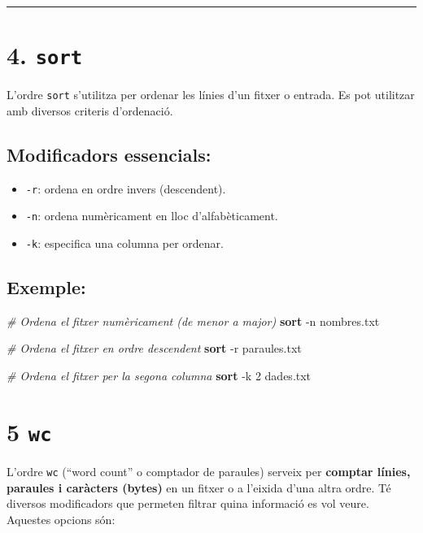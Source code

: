 \documentclass[
  12 pt,
  a4paper,
]{article}
\newenvironment{Shaded}{\begin{snugshade}}{\end{snugshade}}
\newcommand{\AttributeTok}[1]{\textcolor[rgb]{0.13,0.29,0.53}{#1}}
\newcommand{\CommentTok}[1]{\textcolor[rgb]{0.56,0.35,0.01}{\textit{#1}}}
\newcommand{\FunctionTok}[1]{\textcolor[rgb]{0.13,0.29,0.53}{\textbf{#1}}}
\newcommand{\NormalTok}[1]{#1}
\providecommand{\tightlist}{%
  \setlength{\itemsep}{0pt}\setlength{\parskip}{0pt}}
\begin{document}
\begin{center}\rule{0.5\linewidth}{0.5pt}\end{center}

\section{\texorpdfstring{4. \texttt{sort}}{4. sort}}\label{sort}

L'ordre \texttt{sort} s'utilitza per ordenar les línies d'un fitxer o
entrada. Es pot utilitzar amb diversos criteris d'ordenació.

\subsection{Modificadors essencials:}\label{modificadors-essencials-3}

\begin{itemize}
\tightlist
\item
  \texttt{-r}: ordena en ordre invers (descendent).
\item
  \texttt{-n}: ordena numèricament en lloc d'alfabèticament.
\item
  \texttt{-k}: especifica una columna per ordenar.
\end{itemize}

\subsection{Exemple:}\label{exemple-3}

\begin{Shaded}
\begin{Highlighting}[]
\CommentTok{\# Ordena el fitxer numèricament (de menor a major)}
\FunctionTok{sort} \AttributeTok{{-}n}\NormalTok{ nombres.txt}

\CommentTok{\# Ordena el fitxer en ordre descendent}
\FunctionTok{sort} \AttributeTok{{-}r}\NormalTok{ paraules.txt}

\CommentTok{\# Ordena el fitxer per la segona columna}
\FunctionTok{sort} \AttributeTok{{-}k}\NormalTok{ 2 dades.txt}
\end{Highlighting}
\end{Shaded}

\section{\texorpdfstring{5 \texttt{wc}}{5 wc}}\label{wc}

L'ordre \texttt{wc} (``word count'' o comptador de paraules) serveix per
\textbf{comptar línies, paraules i caràcters (bytes)} en un fitxer o a
l'eixida d'una altra ordre. Té diversos modificadors que permeten
filtrar quina informació es vol veure. Aquestes opcions són:
\end{document}
